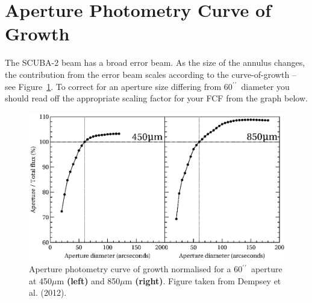 \documentclass[twoside,11pt]{article}
\newcommand{\xlabel}[1]{}
\renewcommand{\_}{\texttt{\symbol{95}}}
\newcommand{\arcmin}{\mbox{$^\prime$}}
\newcommand{\arcsec}{\arcmin\hspace*{-0.1em}\arcmin}
\begin{document}
\section{\xlabel{fcfsred}Aperture Photometry Curve of Growth}
\label{app:cog}

The SCUBA-2 beam has a broad error beam. As the size of the annulus
changes, the contribution from the error beam scales according to the
curve-of-growth -- see Figure~\ref{fig:cog}. To correct for an
aperture size differing from 60\arcsec\ diameter you should read off the
appropriate scaling factor for your FCF from the graph below.


\begin{figure}[h!]
\centering
\includegraphics[width=0.95\linewidth]{sc21_curveofgrowth.eps}
\caption{\small Aperture photometry curve of growth normalised for a
60\arcsec\ aperture at 450$\mu$m \textbf{(left)} and 850$\mu$m \textbf{(right)}.
Figure taken from Dempsey et al. (2012).}
\label{fig:cog}
\end{figure}
\end{document}
